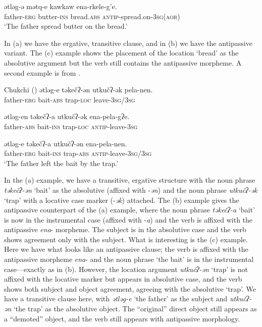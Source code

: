 \documentclass[output=paper,colorlinks,citecolor=brown,modfonts,nonflat]{langsci/langscibook}
\begin{document}
	\ex \label{ex:basilico:10c}
	\gll  ətləg-ə  mətq-e  kawkaw  ena-rkele-g’e.\\
	father-\textsc{{erg}}  butter-\textsc{{ins}}  bread.\textsc{{abs}}  \textsc{antip}{}-{spread.on}-3\textsc{sg}(\textsc{{aor}})\\
	\glt `The father spread butter on the bread.'
	\z
	\z

In (a) we have the ergative, transitive clause, and in (b) we have the antipassive variant. The (c) example shows the placement of the location ‘bread’ as the absolutive argument but the verb still contains the antipassive morpheme. A second example is from  \citet{KozinskyNedjalkovPolinskaja1988}.

\ea%
    Chukchi (\citealt{KozinskyNedjalkovPolinskaja1988}) \label{ex:basilico:11}
    \ea \label{ex:basilico:11a}
    \gll ətləg-e   təkečʔ-ən   utkučʔ-ək   pela-nen.\\
    father-\textsc{{erg}}   bait-\textsc{{abs}}   trap-\textsc{loc}   leave-3\textsc{sg}/3\textsc{sg}\\
    \glt

    \ex \label{ex:basilico:11b}
    \gll ətləg-en   təkečʔ-a   utkučʔ-ək   ena-pela-gʔe.\\
    father-\textsc{{abs}}  bait-\textsc{ins}  trap-\textsc{loc}  \textsc{antip}{}-leave-3\textsc{sg}\\
    \glt

    \ex \label{ex:basilico:11c}
    \gll ətləg-e  təkečʔ-a  utkučʔ-ən  ena-pela-nen.\\
    father-\textsc{{erg}}  bait-\textsc{ins}  trap-\textsc{{abs}}  \textsc{antip}{}-leave-3\textsc{sg}/3\textsc{sg}\\
    \glt `The father left the bait by the trap.'
    \z
    \z


In the (a) example, we have a transitive, ergative structure with the noun phrase \textit{təkečʔ-ən} ‘bait’ as the absolutive (affixed with -\textit{ən}) and the noun phrase \textit{utkučʔ-ək} ‘trap’ with a locative case marker (-\textit{ək}) attached. The (b) example gives the antipassive counterpart of the (a) example, where the noun phrase \textit{təkečʔ-a} ‘bait’ is now in the instrumental case (affixed with -\textit{a}) and the verb is affixed with the antipassive \textit{ena}{}- morpheme. The subject is in the absolutive case and the verb shows agreement only with the subject. What is interesting is the (c) example. Here we have what looks like an antipassive clause; the verb is affixed with the antipassive morpheme \textit{ena}{}- and the noun phrase ‘the bait’ is in the instrumental case—exactly as in (b). However, the location argument \textit{utkučʔ-ən} ‘trap’ is not affixed with the locative marker but appears in absolutive case, and the verb shows both subject and object agreement, agreeing with the absolutive ‘trap’. We have a transitive clause here, with \textit{ətləg-e} ‘the father’ as the subject and \textit{utkučʔ-ən} ‘the trap’ as the absolutive object. The ``original'' direct object still appears as a ``demoted'' object, and the verb still appears with antipassive morphology.
\end{document}
